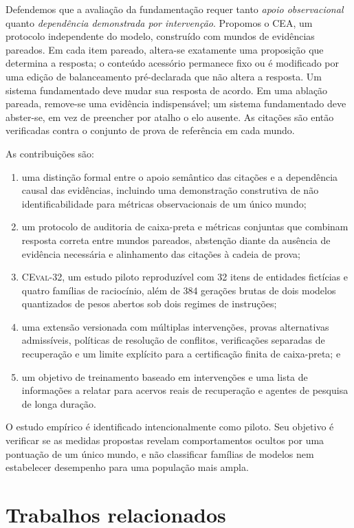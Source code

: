 \documentclass[10pt,twocolumn]{article}
\newcommand{\method}{\textsc{CEA}}
\newcommand{\dataset}{\textsc{CEval-32}}
\begin{document}
Defendemos que a avaliação da fundamentação requer tanto \emph{apoio observacional} quanto \emph{dependência demonstrada por intervenção}. Propomos o \method, um protocolo independente do modelo, construído com mundos de evidências pareados. Em cada item pareado, altera-se exatamente uma proposição que determina a resposta; o conteúdo acessório permanece fixo ou é modificado por uma edição de balanceamento pré-declarada que não altera a resposta. Um sistema fundamentado deve mudar sua resposta de acordo. Em uma ablação pareada, remove-se uma evidência indispensável; um sistema fundamentado deve abster-se, em vez de preencher por atalho o elo ausente. As citações são então verificadas contra o conjunto de prova de referência em cada mundo.

As contribuições são:
\begin{enumerate}[leftmargin=*,itemsep=2pt,topsep=3pt]
    \item uma distinção formal entre o apoio semântico das citações e a dependência causal das evidências, incluindo uma demonstração construtiva de não identificabilidade para métricas observacionais de um único mundo;
    \item um protocolo de auditoria de caixa-preta e métricas conjuntas que combinam resposta correta entre mundos pareados, abstenção diante da ausência de evidência necessária e alinhamento das citações à cadeia de prova;
    \item \dataset, um estudo piloto reproduzível com 32 itens de entidades fictícias e quatro famílias de raciocínio, além de 384 gerações brutas de dois modelos quantizados de pesos abertos sob dois regimes de instruções;
    \item uma extensão versionada com múltiplas intervenções, provas alternativas admissíveis, políticas de resolução de conflitos, verificações separadas de recuperação e um limite explícito para a certificação finita de caixa-preta; e
    \item um objetivo de treinamento baseado em intervenções e uma lista de informações a relatar para acervos reais de recuperação e agentes de pesquisa de longa duração.
\end{enumerate}

O estudo empírico é identificado intencionalmente como piloto. Seu objetivo é verificar se as medidas propostas revelam comportamentos ocultos por uma pontuação de um único mundo, e não classificar famílias de modelos nem estabelecer desempenho para uma população mais ampla.

\section{Trabalhos relacionados}
\end{document}
